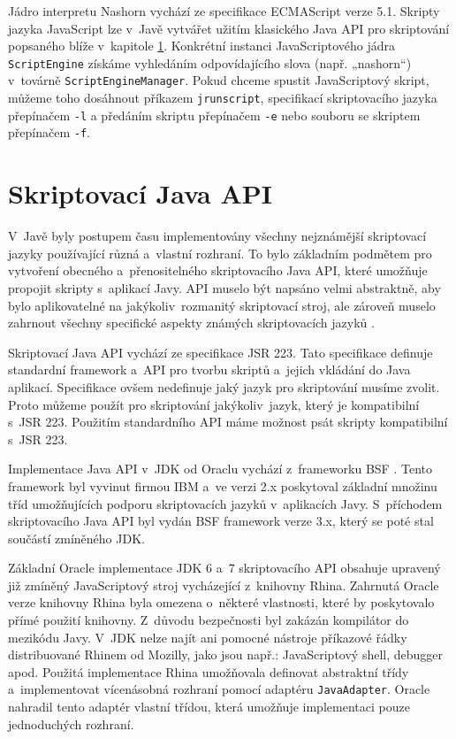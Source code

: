 Jádro interpretu Nashorn vychází ze specifikace ECMAScript verze 5.1. Skripty jazyka JavaScript lze v~Javě vytvářet užitím klasického Java API pro skriptování popsaného blíže v~kapitole \ref{Chapter.JavaScriptInJavaAnalysis.ScriptingJavaAPI}. Konkrétní instanci JavaScriptového jádra \texttt{ScriptEngine} získáme vyhledáním odpovídajícího slova (např. „nashorn“) v~továrně \texttt{ScriptEngineManager}. Pokud chceme spustit JavaScriptový skript, můžeme toho dosáhnout příkazem \texttt{jrunscript}, specifikací skriptovacího jazyka přepínačem \texttt{-l} a předáním skriptu přepínačem \texttt{-e} nebo souboru se skriptem přepínačem \texttt{-f}.

\section{Skriptovací Java API}
\label{Chapter.JavaScriptInJavaAnalysis.ScriptingJavaAPI}

V~Javě byly postupem času implementovány všechny nejznámější skriptovací jazyky používající různá a~vlastní rozhraní. To bylo základním podmětem pro vytvoření obecného a~přenositelného skriptovacího Java API, které umožňuje propojit skripty s~aplikací Javy. API muselo být napsáno velmi abstraktně, aby bylo aplikovatelné na jakýkoliv~rozmanitý skriptovací stroj, ale zároveň muselo zahrnout všechny specifické aspekty známých skriptovacích jazyků \cite{Bibliography.JavaAPI.Script.Book}.

Skriptovací Java API vychází ze specifikace JSR 223. Tato specifikace definuje standardní framework a~API pro tvorbu skriptů a~jejich vkládání do Java aplikací. Specifikace ovšem nedefinuje jaký jazyk pro skriptování musíme zvolit. Proto můžeme použít pro skriptování jakýkoliv~jazyk, který je kompatibilní s~JSR 223. Použitím standardního API máme možnost psát skripty kompatibilní s~JSR 223.

Implementace Java API v~JDK od Oraclu vychází z~frameworku BSF \cite{Bibliography.BSF.Framework}. Tento framework byl vyvinut firmou IBM a~ve verzi 2.x poskytoval základní množinu tříd umožňujících podporu skriptovacích jazyků v~aplikacích Javy. S~příchodem skriptovacího Java API byl vydán BSF framework verze 3.x, který se poté stal součástí zmíněného JDK.

Základní Oracle implementace JDK 6 a~7 skriptovacího API obsahuje upravený již zmíněný JavaScriptový stroj vycházející z~knihovny Rhina. Zahrnutá Oracle verze knihovny Rhina byla omezena o~některé vlastnosti, které by poskytovalo přímé použití knihovny. Z~důvodu bezpečnosti byl zakázán kompilátor do mezikódu Javy. V~JDK nelze najít ani pomocné nástroje příkazové řádky distribuované Rhinem od Mozilly, jako jsou např.: JavaScriptový shell, debugger apod. Použitá implementace Rhina umožňovala definovat abstraktní třídy a~implementovat vícenásobná rozhraní pomocí adaptéru \texttt{JavaAdapter}. Oracle nahradil tento adaptér vlastní třídou, která umožňuje implementaci pouze jednoduchých rozhraní. 

